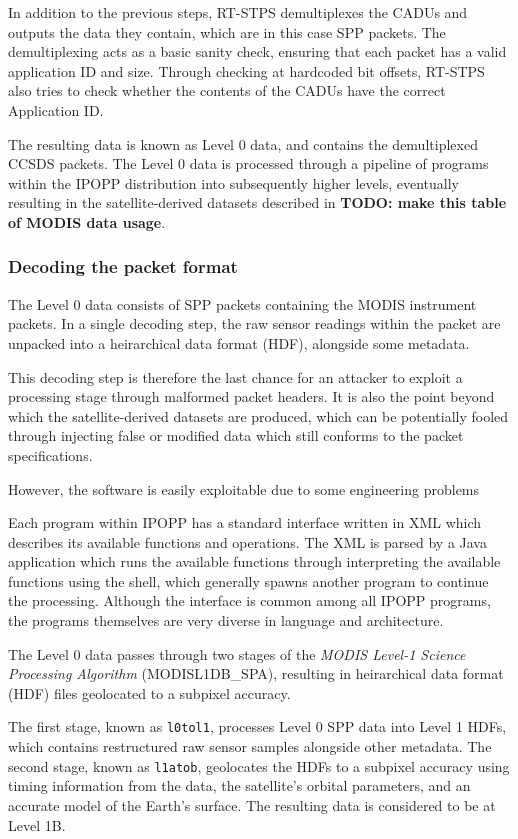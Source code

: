 In addition to the previous steps, RT-STPS demultiplexes the CADUs and outputs the data they contain, which are in this case SPP packets.
The demultiplexing acts as a basic sanity check, ensuring that each packet has a valid application ID and size.
Through checking at hardcoded bit offsets, RT-STPS also tries to check whether the contents of the CADUs have the correct Application ID.

The resulting data is known as Level 0 data, and contains the demultiplexed CCSDS packets.
The Level 0 data is processed through a pipeline of programs within the IPOPP distribution into subsequently higher levels, eventually resulting in the satellite-derived datasets described in \textbf{TODO: make this table of MODIS data usage}.

\subsubsection{Decoding the packet format}

The Level 0 data consists of SPP packets containing the MODIS instrument packets.
In a single decoding step, the raw sensor readings within the packet are unpacked into a heirarchical data format (HDF), alongside some metadata.

This decoding step is therefore the last chance for an attacker to exploit a processing stage through malformed packet headers.
It is also the point beyond which the satellite-derived datasets are produced, which can be potentially fooled through injecting false or modified data which still conforms to the packet specifications.

However, the software is easily exploitable due to some engineering problems


Each program within IPOPP has a standard interface written in XML which describes its available functions and operations.
The XML is parsed by a Java application which runs the available functions through interpreting the available functions using the shell, which generally spawns another program to continue the processing.
Although the interface is common among all IPOPP programs, the programs themselves are very diverse in language and architecture.


The Level 0 data passes through two stages of the \textit{MODIS Level-1 Science Processing Algorithm} (MODISL1DB\_SPA), resulting in heirarchical data format (HDF) files geolocated to a subpixel accuracy.

The first stage, known as \texttt{l0tol1}, processes Level 0 SPP data into Level 1 HDFs, which contains restructured raw sensor samples alongside other metadata.
The second stage, known as \texttt{l1atob}, geolocates the HDFs to a subpixel accuracy using timing information from the data, the satellite's orbital parameters, and an accurate model of the Earth's surface.
The resulting data is considered to be at Level 1B.

